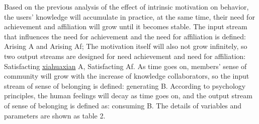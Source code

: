 \documentclass{elsarticle}
\begin{document}
Based on the previous analysis of the effect of intrinsic motivation
on behavior, the users’ knowledge will accumulate in practice, at the
same time, their need for achievement and affiliation will grow until
it becomes stable. The input stream that influences the need for
achievement and the need for affiliation is defined: Arising A and
Arising Af; The motivation itself will also not grow infinitely, so
two output streams are designed for need achievement and need for
affiliation: Satisfacting \underline{xiahuaxian} A, Satisfacting Af. As time goes on,
members’ sense of community will grow with the increase of knowledge
collaborators, so the input stream of sense of belonging is defined:
generating B. According to psychology principles, the human feelings
will decay as time goes on, and the output stream of sense of
belonging is defined as: consuming B. The details of variables and
parameters are shown as table 2. 
\end{document}
